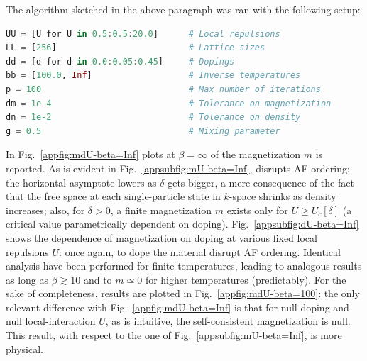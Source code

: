 The algorithm sketched in the above paragraph was ran with the following setup:
\begin{lstlisting}[language=julia]
UU = [U for U in 0.5:0.5:20.0]      # Local repulsions
LL = [256]             				# Lattice sizes
dd = [d for d in 0.0:0.05:0.45]     # Dopings
bb = [100.0, Inf]				    # Inverse temperatures
p = 100                             # Max number of iterations
dm = 1e-4                           # Tolerance on magnetization
dn = 1e-2                           # Tolerance on density
g = 0.5                             # Mixing parameter
\end{lstlisting}
In Fig.~\ref{appfig:mdU-beta=Inf} plots at $\beta=\infty$ of the magnetization $m$ is reported. As is evident in Fig.~\ref{appsubfig:mU-beta=Inf}, disrupts AF ordering; the horizontal asymptote lowers as $\delta$ gets bigger, a mere consequence of the fact that the free space at each single-particle state in $k$-space shrinks as density increases; also, for $\delta > 0$, a finite magnetization $m$ exists only for $U \ge U_c[\delta]$ (a critical value parametrically dependent on doping). Fig.~\ref{appsubfig:dU-beta=Inf} shows the dependence of magnetization on doping at various fixed local repulsions $U$: once again, to dope the material disrupt AF ordering. Identical analysis have been performed for finite temperatures, leading to analogous results as long as $\beta \gtrsim 10$ and to $m \simeq 0$ for higher temperatures (predictably). For the sake of completeness, results are plotted in Fig.~\ref{appfig:mdU-beta=100}: the only relevant difference with Fig.~\ref{appfig:mdU-beta=Inf} is that for null doping and null local-interaction $U$, as is intuitive, the self-consistent magnetization is null. This result, with respect to the one of Fig.~\ref{appsubfig:mU-beta=Inf}, is more physical.

